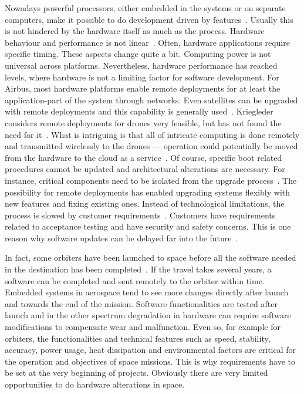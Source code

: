 \documentclass[english]{tktltiki2}
\begin{document}
Nowadays powerful processors, either embedded in the systems or on separate computers, make it possible to do development driven by features~\cite{Koi15}. Usually this is not hindered by the hardware itself as much as the process. Hardware behaviour and performance is not linear~\cite{Hol15a}. Often, hardware applications require specific timing. These aspects change quite a bit. Computing power is not universal across platforms. Nevertheless, hardware performance has reached levels, where hardware is not a limiting factor for software development. For Airbus, most hardware platforms enable remote deployments for at least the application-part of the system through networks. Even satellites can be upgraded with remote deployments and this capability is generally used~\cite{Hol15b}. Kriegleder considers remote deployments for drones very feasible, but has not found the need for it~\cite{Kri15}. What is intriguing is that all of intricate computing is done remotely and transmitted wirelessly to the drones — operation could potentially be moved from the hardware to the cloud as a service~\cite{Kri15}. Of course, specific boot related procedures cannot be updated and architectural alterations are necessary. For instance, critical components need to be isolated from the upgrade process~\cite{Kri15}. The possibility for remote deployments has enabled upgrading systems flexibly with new features and fixing existing ones. Instead of technological limitations, the process is slowed by customer requirements~\cite{Hol15b, Koi15}. Customers have requirements related to acceptance testing and have security and safety concerns. This is one reason why software updates can be delayed far into the future~\cite{Koi15}.

In fact, some orbiters have been launched to space before all the software needed in the destination has been completed~\cite{Hol15b}. If the travel takes several years, a software can be completed and sent remotely to the orbiter within time. Embedded systems in aerospace tend to see more changes directly after launch and towards the end of the mission. Software functionalities are tested after launch and in the other spectrum degradation in hardware can require software modifications to compensate wear and malfunction. Even so, for example for orbiters, the functionalities and technical features such as speed, stability, accuracy, power usage, heat dissipation and environmental factors are critical for the operation and objectives of space missions. This is why requirements have to be set at the very beginning of projects. Obviously there are very limited opportunities to do hardware alterations in space.
\end{document}
